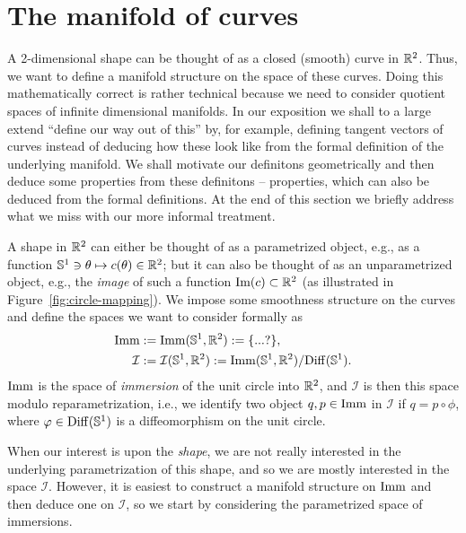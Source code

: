 \section{The manifold of curves}
\label{sec:manifold-curves}

A 2-dimensional shape can be thought of as a closed (smooth) curve in $\R^2$. Thus, we want to define a manifold structure on the space of these curves. Doing this mathematically correct is rather technical because we need to consider quotient spaces of infinite dimensional manifolds. In our exposition we shall to a large extend ``define our way out of this'' by, for example, defining tangent vectors of curves instead of deducing how these look like from the formal definition of the underlying manifold. We shall motivate our definitons geometrically and then deduce some properties from these definitons -- properties, which can also be deduced from the formal definitions. At the end of this section we briefly address what we miss with our more informal treatment.

A shape in $\R^2$ can either be thought of as a parametrized object, e.g., as a function $\S^1 \ni \theta \mapsto c(\theta) \in \R^2$; but it can also be thought of as an unparametrized object, e.g., the \textit{image} of such a function $\text{Im}(c) \subset \R^2$ (as illustrated in Figure~\ref{fig:circle-mapping}). We impose some smoothness structure on the curves and define the spaces we want to consider formally as
\begin{equation*}
  \begin{aligned}
    \I & := \I(\S^1, \R^2)  :=  \{ ...? \}, \\
    \mathcal{I} & := \mathcal{I}(\S^1, \R^2)  := \I(\S^1, \R^2)/\mathrm{Diff}(\S^1).
  \end{aligned}
\end{equation*}
$\I$ is the space of \textit{immersion} of the unit circle into $\R^2$, and $\mathcal{I}$ is then this space modulo reparametrization, i.e., we identify two object $q,p \in \I$ in $\mathcal{I}$ if $q=p \circ \phi$, where $\phi \in \mathrm{Diff}(\S^1)$ is a diffeomorphism on the unit circle.

When our interest is upon the \textit{shape}, we are not really interested in the underlying parametrization of this shape, and so we are mostly interested in the space $\mathcal{I}$. However, it is easiest to construct a manifold structure on $\I$ and then deduce one on $\mathcal{I}$, so we start by considering the parametrized space of immersions.

